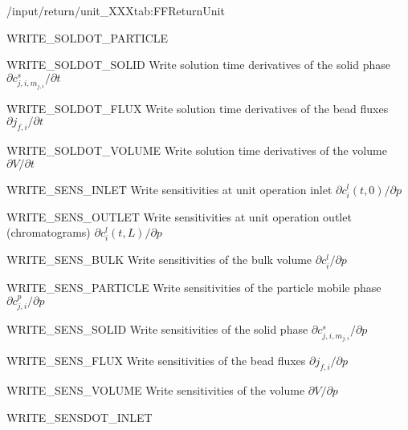 \begin{groupscope}{/input/return/unit\_XXX}{tab:FFReturnUnit}
\begin{dataset}[type=int, range={$\{0,1\}$}]{WRITE\_SOLDOT\_PARTICLE}
  \end{dataset}
  \begin{dataset}[type=int, range={$\{0,1\}$}]{WRITE\_SOLDOT\_SOLID}
    Write solution time derivatives of the solid phase $\partial c^s_{j,i,m_{j,i}} / \partial t$
  \end{dataset}
  \begin{dataset}[type=int, range={$\{0,1\}$}]{WRITE\_SOLDOT\_FLUX}
    Write solution time derivatives of the bead fluxes $\partial j_{f,i} / \partial t$
  \end{dataset}
  \begin{dataset}[type=int, range={$\{0,1\}$}]{WRITE\_SOLDOT\_VOLUME}
    Write solution time derivatives of the volume $\partial V / \partial t$
  \end{dataset}
  \begin{dataset}[type=int, range={$\{0,1\}$}]{WRITE\_SENS\_INLET}
    Write sensitivities at unit operation inlet $\partial c^l_i(t,0) / \partial p$
  \end{dataset}
  \begin{dataset}[type=int, range={$\{0,1\}$}]{WRITE\_SENS\_OUTLET}
    Write sensitivities at unit operation outlet (chromatograms) $\partial c^l_i(t,L) / \partial p$
  \end{dataset}
  \begin{dataset}[type=int, range={$\{0,1\}$}]{WRITE\_SENS\_BULK}
    Write sensitivities of the bulk volume $\partial c^l_i / \partial p$
  \end{dataset}
  \begin{dataset}[type=int, range={$\{0,1\}$}]{WRITE\_SENS\_PARTICLE}
    Write sensitivities of the particle mobile phase $\partial c^p_{j,i} / \partial p$
  \end{dataset}
  \begin{dataset}[type=int, range={$\{0,1\}$}]{WRITE\_SENS\_SOLID}
    Write sensitivities of the solid phase $\partial c^s_{j,i,m_{j,i}} / \partial p$
  \end{dataset}
  \begin{dataset}[type=int, range={$\{0,1\}$}]{WRITE\_SENS\_FLUX}
    Write sensitivities of the bead fluxes $\partial j_{f,i} / \partial p$
  \end{dataset}
  \begin{dataset}[type=int, range={$\{0,1\}$}]{WRITE\_SENS\_VOLUME}
    Write sensitivities of the volume $\partial V / \partial p$
  \end{dataset}
  \begin{dataset}[type=int, range={$\{0,1\}$}]{WRITE\_SENSDOT\_INLET}

\end{dataset}
\end{groupscope}
